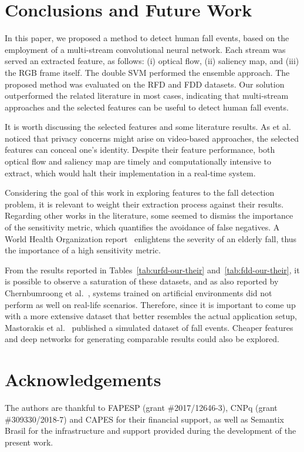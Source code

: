 \documentclass[10pt, conference, compsocconf]{IEEEtran}
\begin{document}
\section{Conclusions and Future Work}
\label{sec:conclusion}

In this paper, we proposed a method to detect human fall events, based on the employment of a multi-stream convolutional neural network. Each stream was served an extracted feature, as follows: (i) optical flow, (ii) saliency map, and (iii) the RGB frame itself. The double SVM performed the ensemble approach. The proposed method was evaluated on the RFD and FDD datasets. Our solution outperformed the related literature in most cases, indicating that multi-stream approaches and the selected features can be useful to detect human fall events.

It is worth discussing the selected features and some literature results. As et al.~\cite{chernbumroong2012elderly} noticed that privacy concerns might arise on video-based approaches, the selected features can conceal one's identity. Despite their feature performance, both optical flow and saliency map are timely and computationally intensive to extract, which would halt their implementation in a real-time system.

Considering the goal of this work in exploring features to the fall detection problem, it is relevant to weight their extraction process against their results. Regarding other works in the literature, some seemed to dismiss the importance of the sensitivity metric, which quantifies the avoidance of false negatives. A World Health Organization report~\cite{who2007report} enlightens the severity of an elderly fall, thus the importance of a high sensitivity metric.

From the results reported in Tables~\ref{tab:urfd-our-their} and~\ref{tab:fdd-our-their}, it is possible to observe a saturation of these datasets, and as also reported by Chernbumroong et al.~\cite{chernbumroong2012elderly}, systems trained on artificial environments did not perform as well on real-life scenarios. Therefore, since it is important to come up with a more extensive dataset that better resembles the actual application setup, Mastorakis et al.~\cite{mastorakis2018fall} published a simulated dataset of fall events. Cheaper features and deep networks for generating comparable results could also be explored.

\section*{Acknowledgements}

The authors are thankful to FAPESP (grant \#2017/12646-3), CNPq (grant \#309330/2018-7) and CAPES for their financial support, as well as Semantix Brasil for the infrastructure and support provided during the development of the present work.



\end{document}
